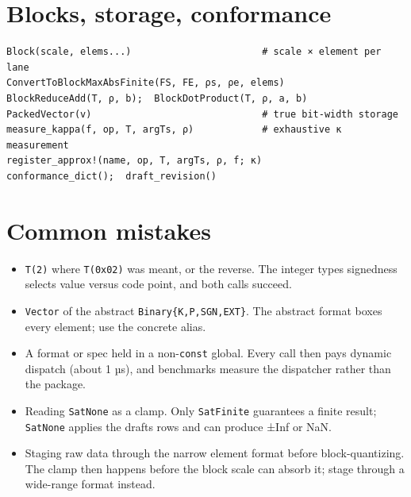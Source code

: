 \section{Blocks, storage, conformance}



\label{12630375890338194343}{}



\begin{verbatim}
Block(scale, elems...)                       # scale × element per lane
ConvertToBlockMaxAbsFinite(FS, FE, ρs, ρe, elems)
BlockReduceAdd(T, ρ, b);  BlockDotProduct(T, ρ, a, b)
PackedVector(v)                              # true bit-width storage
measure_kappa(f, op, T, argTs, ρ)            # exhaustive κ measurement
register_approx!(name, op, T, argTs, ρ, f; κ)
conformance_dict();  draft_revision()
\end{verbatim}



\section{Common mistakes}



\label{8766050074116339039}{}


\begin{itemize}
\item[1. ] \texttt{T(2)} where \texttt{T(0x02)} was meant, or the reverse. The integer type{\textquotesingle}s signedness selects value versus code point, and both calls succeed.


\item[2. ] \texttt{Vector} of the abstract \texttt{Binary\{K,P,SGN,EXT\}}. The abstract format boxes every element; use the concrete alias.


\item[3. ] A format or spec held in a non-\texttt{const} global. Every call then pays dynamic dispatch (about 1 µs), and benchmarks measure the dispatcher rather than the package.


\item[4. ] Reading \texttt{SatNone} as a clamp. Only \texttt{SatFinite} guarantees a finite result; \texttt{SatNone} applies the draft{\textquotesingle}s rows and can produce ±Inf or NaN.


\item[5. ] Staging raw data through the narrow element format before block-quantizing. The clamp then happens before the block scale can absorb it; stage through a wide-range format instead.

\end{itemize}


